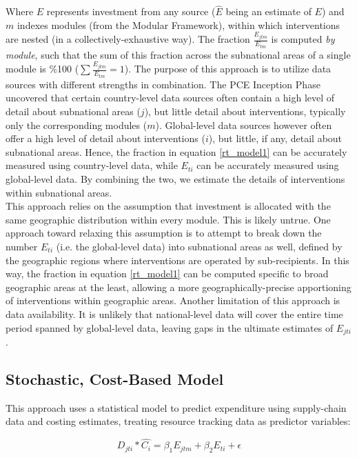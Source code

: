 \documentclass[twocolumn]{bmcart}%
\begin{document}
Where $E$ represents investment from any source ($\hat{E}$ being an estimate of $E$) and $m$ indexes modules (from the Modular Framework), within which interventions are nested (in a collectively-exhaustive way). The fraction $\frac{E_{jtm}}{E_{tm}}$ is computed \textit{by module}, such that the sum of this fraction across the subnational areas of a single module is \%100 ($\sum \frac{E_{jtm}}{E_{tm}}=1$). The purpose of this approach is to utilize data sources with different strengths in combination. The PCE Inception Phase uncovered that certain country-level data sources often contain a high level of detail about subnational areas ($j$), but little detail about interventions, typically only the corresponding modules ($m$). Global-level data sources however often offer a high level of detail about interventions ($i$), but little, if any, detail about subnational areas. Hence, the fraction in equation \ref{rt_model1} can be accurately measured using country-level data, while $E_{ti}$ can be accurately measured using global-level data. By combining the two, we estimate the details of interventions within subnational areas.\\

This approach relies on the assumption that investment is allocated with the same geographic distribution  within every module. This is likely untrue. One approach toward relaxing this assumption is to attempt to break down the number $E_{ti}$ (i.e. the global-level data) into subnational areas as well, defined by the geographic regions where interventions are operated by sub-recipients. In this way, the fraction in equation \ref{rt_model1} can be computed specific to broad geographic areas at the least, allowing a more geographically-precise apportioning of interventions within geographic areas. Another limitation of this approach is data availability. It is unlikely that national-level data will cover the entire time period spanned by global-level data, leaving gaps in the ultimate estimates of $E_{jti}$.

\subsection{Stochastic, Cost-Based Model}

This approach uses a statistical model to predict expenditure using supply-chain data and costing estimates, treating resource tracking data as predictor variables:

\begin{equation}
  \label{costmodel}
  D_{jti} * \widehat{C_i} = \beta_1 E_{jtm} + \beta_2 E_{ti} + \epsilon
\end{equation}
\end{document}
